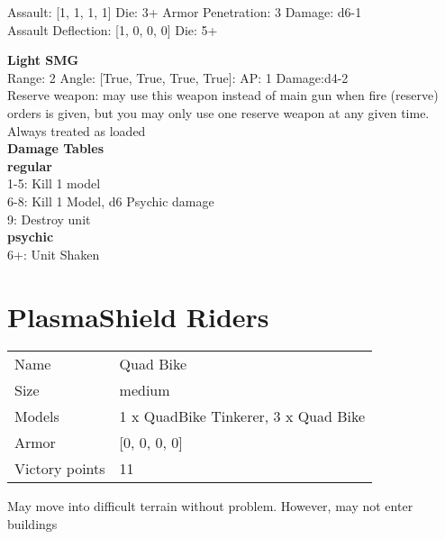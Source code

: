 Assault: [1, 1, 1, 1] Die: 3+ Armor Penetration: 3 Damage: d6-1 \\
Assault Deflection: [1, 0, 0, 0] Die: 5+\\
\indent  



{\bf Light SMG } \\



Range: 2  Angle: [True, True, True, True]: AP: 1 Damage:d4-2 \\
Reserve weapon: may use this weapon instead of main gun when fire (reserve) orders is given, but you may only use one reserve weapon at any given time.\\ 
Always treated as loaded\\ 




 





{\bf Damage Tables} \\
 {\bf regular } \\
1-5: Kill 1 model \\
6-8: Kill 1 Model, d6 Psychic damage \\
9: Destroy unit \\
 {\bf psychic } \\
6+: Unit Shaken \\










\pagebreak\pagebreak

\section{ PlasmaShield Riders }

\begin{tabular}{ll}
  Name & Quad Bike \\
  Size & medium\\
  Models & 1 x QuadBike Tinkerer, 3 x Quad Bike\\
  Armor & [0, 0, 0, 0]\\
  Victory points & 11\\
\end{tabular}

May move into difficult terrain without problem. However, may not enter buildings\\ 


